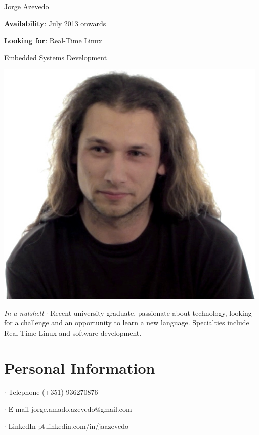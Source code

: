 



\topSection
{
	{\Huge Jorge Azevedo}

	\vspace{1.5mm}
	\vspace*{10mm}

	\textbf{Availability}: July 2013 onwards

	\textbf{Looking for}: Real-Time Linux

	\hspace{66pt}Embedded Systems Development
} {
	\includegraphics[width=0.985\textwidth]{img/photo}
}

\emph{In a nutshell} $\cdot$  Recent university graduate, passionate about
technology, looking for a challenge and an opportunity to learn a new language.
Specialties include Real-Time Linux and software development.

\section*{Personal Information}

{
 $\cdot$  Telephone (+351) 936270876

 $\cdot$  E-mail jorge.amado.azevedo@gmail.com

 $\cdot$  LinkedIn pt.linkedin.com/in/jaazevedo
}

